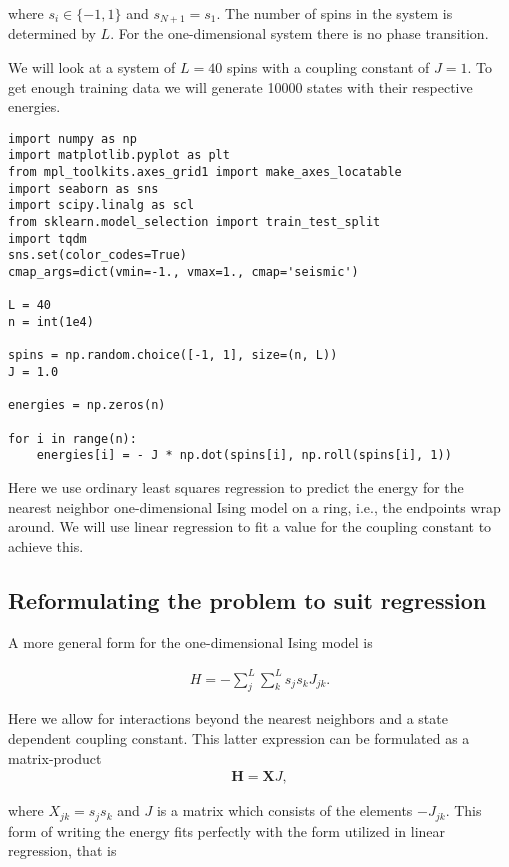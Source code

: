 \documentclass[%
oneside,                 %
final,                   %
10pt]{article}
\begin{document}
where $s_i \in \{-1, 1\}$ and $s_{N + 1} = s_1$. The number of spins
in the system is determined by $L$. For the one-dimensional system
there is no phase transition.

We will look at a system of $L = 40$ spins with a coupling constant of
$J = 1$. To get enough training data we will generate 10000 states
with their respective energies.


\begin{verbatim}
import numpy as np
import matplotlib.pyplot as plt
from mpl_toolkits.axes_grid1 import make_axes_locatable
import seaborn as sns
import scipy.linalg as scl
from sklearn.model_selection import train_test_split
import tqdm
sns.set(color_codes=True)
cmap_args=dict(vmin=-1., vmax=1., cmap='seismic')

L = 40
n = int(1e4)

spins = np.random.choice([-1, 1], size=(n, L))
J = 1.0

energies = np.zeros(n)

for i in range(n):
    energies[i] = - J * np.dot(spins[i], np.roll(spins[i], 1))
\end{verbatim}

Here we use ordinary least squares
regression to predict the energy for the nearest neighbor
one-dimensional Ising model on a ring, i.e., the endpoints wrap
around. We will use linear regression to fit a value for
the coupling constant to achieve this.

\subsection*{Reformulating the problem to suit regression}

A more general form for the one-dimensional Ising model is

\begin{align}
    H = - \sum_j^L \sum_k^L s_j s_k J_{jk}.
\end{align}

Here we allow for interactions beyond the nearest neighbors and a state dependent
coupling constant. This latter expression can be formulated as
a matrix-product
\begin{align}
    \bm{H} = \bm{X} J,
\end{align}

where $X_{jk} = s_j s_k$ and $J$ is a matrix which consists of the
elements $-J_{jk}$. This form of writing the energy fits perfectly
with the form utilized in linear regression, that is
\end{document}

